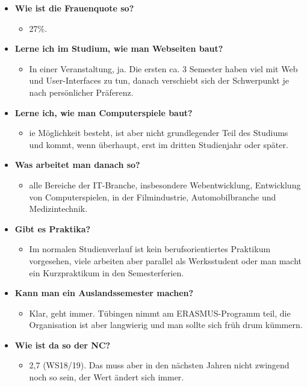 \begin{large}
\begin{itemize}
\item \textbf{Wie ist die Frauenquote so?}
\begin{itemize}
	\item 27\%.
\end{itemize}

\item \textbf{Lerne ich im Studium, wie man Webseiten baut?}
\begin{itemize}
	\item In einer Veranstaltung, ja. Die ersten ca. 3 Semester haben viel mit Web und User-Interfaces zu tun, danach verschiebt sich der Schwerpunkt je nach persönlicher Präferenz.
\end{itemize}

\item \textbf{Lerne ich, wie man Computerspiele baut?}
\begin{itemize}
	\item ie Möglichkeit besteht, ist aber nicht grundlegender Teil des Studiums und kommt, wenn überhaupt, erst im dritten Studienjahr oder später.
\end{itemize}

\item \textbf{Was arbeitet man danach so?}
\begin{itemize}
	\item alle Bereiche der IT-Branche, insbesondere Webentwicklung, Entwicklung von Computerspielen, in der Filmindustrie, Automobilbranche und Medizintechnik.
\end{itemize}

\item \textbf{Gibt es Praktika?}
\begin{itemize}
	\item Im normalen Studienverlauf ist kein berufsorientiertes Praktikum vorgesehen, viele arbeiten aber parallel als Werksstudent oder man macht ein Kurzpraktikum in den Semesterferien.
\end{itemize}

\item \textbf{Kann man ein Auslandssemester machen?}
\begin{itemize}
	\item Klar, geht immer. Tübingen nimmt am ERASMUS-Programm teil, die Organisation ist aber langwierig und man sollte sich früh drum kümmern.
\end{itemize}

\item \textbf{Wie ist da so der NC?}
\begin{itemize}
	\item 2,7 (WS18/19). Das muss aber in den nächsten Jahren nicht zwingend noch so sein, der Wert ändert sich immer.
\end{itemize}

\end{itemize}

\end{large}